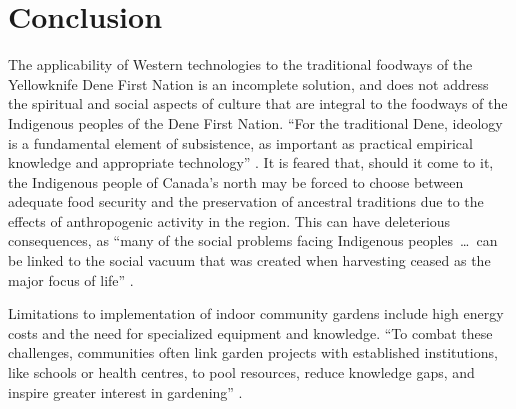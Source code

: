 \documentclass{report}
\begin{document}
\section{Conclusion}

\hspace{24pt} The applicability of Western technologies to the traditional foodways of the Yellowknife Dene First Nation is an incomplete solution, and does not address the spiritual and social aspects of culture that are integral to the foodways of the Indigenous peoples of the Dene First Nation.
``For the traditional Dene, ideology is a fundamental element of subsistence, as important as practical empirical knowledge and appropriate technology'' \parencite[64]{lorecapturingtraditional}.
It is feared that, should it come to it, the Indigenous people of Canada's north may be forced to choose between adequate food security and the preservation of ancestral traditions due to the effects of anthropogenic activity in the region. 
This can have deleterious consequences, as ``many of the social problems facing Indigenous peoples~\ldots~can be linked to the social vacuum that was created when harvesting ceased as the major focus of life'' \parencite[269]{socialculturalcapital}.



\hspace{24pt} Limitations to implementation of indoor community gardens include high energy costs and the need for specialized equipment and knowledge. ``To combat these challenges, communities often link garden projects with established institutions, like schools or health centres, to pool resources, reduce knowledge gaps, and inspire greater interest in gardening'' \parencite[90]{resilientcommunities}.

\clearpage

\printbibliography
\end{document}
